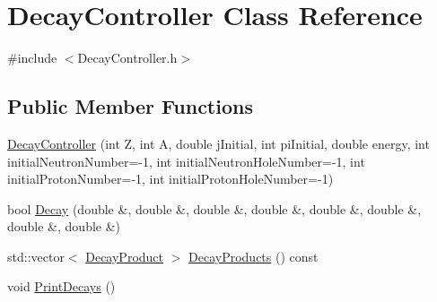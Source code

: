 \hypertarget{classDecayController}{\section{Decay\-Controller Class Reference}
\label{classDecayController}
}


{\ttfamily \#include $<$Decay\-Controller.\-h$>$}

\subsection*{Public Member Functions}
\begin{DoxyCompactItemize}
\item 
\hyperlink{classDecayController_a76bc752d815a48e34a81c936a677bbc5}{Decay\-Controller} (int Z, int A, double j\-Initial, int pi\-Initial, double energy, int initial\-Neutron\-Number=-\/1, int initial\-Neutron\-Hole\-Number=-\/1, int initial\-Proton\-Number=-\/1, int initial\-Proton\-Hole\-Number=-\/1)
\item 
bool \hyperlink{classDecayController_a3b69fa95266fab7801d7f04cc7a571c9}{Decay} (double \&, double \&, double \&, double \&, double \&, double \&, double \&, double \&)
\item 
std\-::vector$<$ \hyperlink{classDecayProduct}{Decay\-Product} $>$ \hyperlink{classDecayController_ab6708e92c6be6d09020f714f9d687ac1}{Decay\-Products} () const 
\item 
void \hyperlink{classDecayController_a6bab34eb060a99224e8d176c470e8f20}{Print\-Decays} ()
\end{DoxyCompactItemize}


